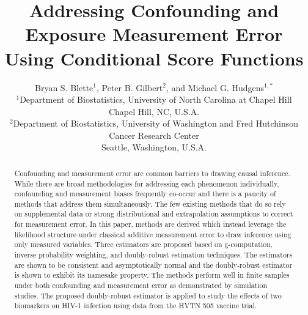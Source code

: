 \documentclass[useAMS,usenatbib,referee]{biom}
\title[Addressing Confounding and Measurement Error]{Addressing Confounding and Exposure Measurement Error Using Conditional Score Functions}
\author{Bryan S. Blette$^{1}$, Peter B. Gilbert$^{2}$, and Michael G. Hudgens$^{1,*}$\email{mhudgens@email.unc.edu} \\ $^{1}$Department of Biostatistics, University of North Carolina at Chapel Hill
\\ Chapel Hill, NC, U.S.A. \\
$^{2}$Department of Biostatistics, University of Washington and Fred Hutchinson Cancer Research Center
\\ Seattle, Washington, U.S.A.}
\begin{document}










\label{firstpage}


\begin{abstract}
Confounding and measurement error are common barriers to drawing causal inference. While there are broad methodologies for addressing each phenomenon individually, confounding and measurement biases frequently co-occur and there is a paucity of methods that address them simultaneously. The few existing methods that do so rely on supplemental data or strong distributional and extrapolation assumptions to correct for measurement error. In this paper, methods are derived which instead leverage the likelihood structure under classical additive measurement error to draw inference using only measured variables. Three estimators are proposed based on g-computation, inverse probability weighting, and doubly-robust estimation techniques. The estimators are shown to be consistent and asymptotically normal and the doubly-robust estimator is shown to exhibit its namesake property. The methods perform well in finite samples under both confounding and measurement error as demonstrated by simulation studies. The proposed doubly-robust estimator is applied to study the effects of two biomarkers on HIV-1 infection using data from the HVTN 505 vaccine trial.
\end{abstract}
\end{document}
